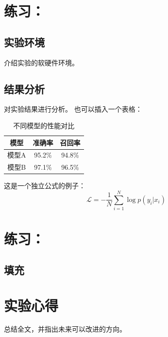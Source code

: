 \documentclass[12pt, a4paper]{ctexart}
\begin{document}
\section{练习：}
\subsection{实验环境}
介绍实验的软硬件环境。

\subsection{结果分析}
对实验结果进行分析。
也可以插入一个表格：
\begin{table}[H]
    \centering
    \begin{tabular}{|c|c|c|}
        \hline
        模型 & 准确率 & 召回率 \\
        \hline
        模型A & 95.2\% & 94.8\% \\
        模型B & 97.1\% & 96.5\% \\
        \hline
    \end{tabular}
    \caption{不同模型的性能对比}
    \label{tab:performance}
\end{table}

这是一个独立公式的例子：
\begin{equation}
    \label{eq:loss}
    \mathcal{L} = -\frac{1}{N}\sum_{i=1}^{N} \log p(y_i | x_i)
\end{equation}

\section{练习：}
\subsection{填充}


\section{实验心得}
总结全文，并指出未来可以改进的方向。
\end{document}
